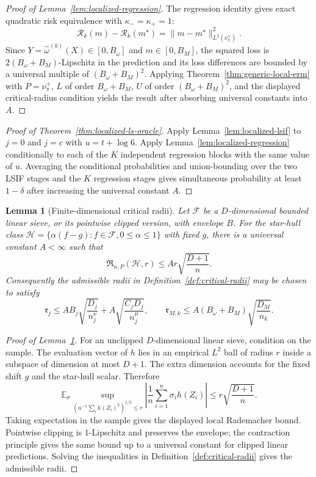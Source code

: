 \documentclass{article}
\newcommand{\sF}{\mathcal{F}}
\newcommand{\sH}{\mathcal{H}}
\newcommand{\E}{\mathbb{E}}
\newcommand{\1}{\mathbf{1}}
\newcommand{\nup}{\nu_\pi^+}
\newcommand{\omegahat}{\widehat{\omega}}
\newcommand{\Risk}{\mathcal{R}}
\newcommand{\Rad}{\mathfrak{R}}
\newcommand{\crit}{\mathfrak{r}}
\theoremstyle{plain}
\newtheorem{lemma}[theorem]{Lemma}
\theoremstyle{definition}
\theoremstyle{remark}
\begin{document}
\begin{proof}[Proof of Lemma~\ref{lem:localized-regression}]
The regression identity gives exact quadratic risk equivalence with $\kappa_-=\kappa_+=1$:
\[
    \Risk_k(m)-\Risk_k(m^\star)
    =
    \|m-m^\star\|_{L^2(\nup)}^2.
\]
Since $Y=\omegahat^{(k)}(X)\in[0,B_\omega]$ and $m\in[0,B_M]$, the squared loss is $2(B_\omega+B_M)$-Lipschitz in the prediction and its loss differences are bounded by a universal multiple of $(B_\omega+B_M)^2$.
Applying Theorem~\ref{thm:generic-local-erm} with $P=\nup$, $L$ of order $B_\omega+B_M$, $U$ of order $(B_\omega+B_M)^2$, and the displayed critical-radius condition yields the result after absorbing universal constants into $A$.
\end{proof}

\begin{proof}[Proof of Theorem~\ref{thm:localized-ls-oracle}]
Apply Lemma~\ref{lem:localized-lsif} to $j=0$ and $j=c$ with $u=t+\log 6$.
Apply Lemma~\ref{lem:localized-regression} conditionally to each of the $K$ independent regression blocks with the same value of $u$.
Averaging the conditional probabilities and union-bounding over the two LSIF stages and the $K$ regression stages gives simultaneous probability at least $1-\delta$ after increasing the universal constant $A$.
\end{proof}

\begin{lemma}[Finite-dimensional critical radii]
\label{lem:finite-critical-radius}
Let $\sF$ be a $D$-dimensional bounded linear sieve, or its pointwise clipped version, with envelope $B$.
For the star-hull class $\sH=\{\alpha(f-g): f\in\sF,0\le\alpha\le1\}$ with fixed $g$, there is a universal constant $A<\infty$ such that
\[
    \Rad_{n,P}(\sH,r)
    \le
    A r\sqrt{\frac{D+1}{n}}.
\]
Consequently the admissible radii in Definition~\ref{def:critical-radii} may be chosen to satisfy
\[
    \crit_j
    \le
    A B_j\sqrt{\frac{D_j}{n_j^\nu}}
    +
    A\sqrt{\frac{C_jD_j}{n_j^\mu}},
    \qquad
    \crit_{M,k}
    \le
    A(B_\omega+B_M)\sqrt{\frac{D_M}{n_k}}.
\]
\end{lemma}

\begin{proof}[Proof of Lemma~\ref{lem:finite-critical-radius}]
For an unclipped $D$-dimensional linear sieve, condition on the sample.
The evaluation vector of $h$ lies in an empirical $L^2$ ball of radius $r$ inside a subspace of dimension at most $D+1$.
The extra dimension accounts for the fixed shift $g$ and the star-hull scalar.
Therefore
\[
    \E_\sigma
    \sup_{\left(n^{-1}\sum_i h(Z_i)^2\right)^{1/2}\le r}
    \left|\frac1n\sum_{i=1}^n\sigma_i h(Z_i)\right|
    \le
    r\sqrt{\frac{D+1}{n}}.
\]
Taking expectation in the sample gives the displayed local Rademacher bound.
Pointwise clipping is $1$-Lipschitz and preserves the envelope; the contraction principle gives the same bound up to a universal constant for clipped linear predictions.
Solving the inequalities in Definition~\ref{def:critical-radii} gives the admissible radii.
\end{proof}
\end{document}

